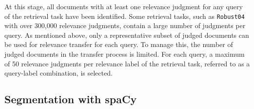 \\\\\\\\\\
At this stage, all documents with at least one relevance judgment for any query of the retrieval task have been identified. Some retrieval tasks, such as \texttt{Robust04} with over 300,000 relevance judgments, contain a large number of judgments per query. As mentioned above, only a representative subset of judged documents can be used for relevance transfer for each query. To manage this, the number of judged documents in the transfer process is limited. For each query, a maximum of 50 relevance judgments per relevance label of the retrieval task, referred to as a query-label combination, is selected.

\subsection{Segmentation with spaCy}\label{segmentation-with-spacy}

